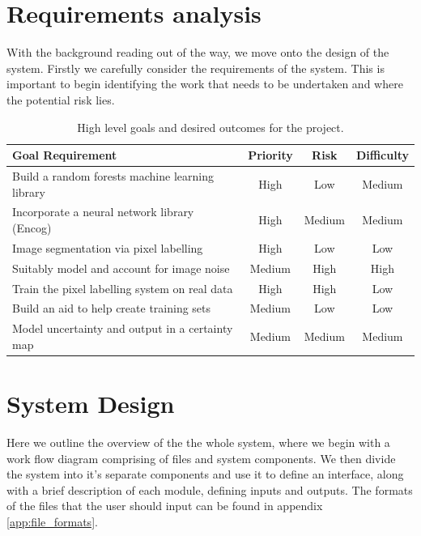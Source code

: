 \documentclass[12pt,twoside,notitlepage]{report}
\begin{document}
    \section{Requirements analysis}
        With the background reading out of the way, we move onto the design of the system. Firstly we carefully consider 
        the requirements of the system. This is important to begin identifying the work that needs to be undertaken 
        and where the potential risk lies. 

        \begin{table}[H]
            \begin{minipage}{\textwidth}
                \begin{tabular}{lccc}
                    \hline 
                        \textbf{Goal Requirement} & \textbf{Priority} & \textbf{Risk} & \textbf{Difficulty} \\
                    \hline 
                        Build a random forests machine learning library       & High      & Low         & Medium    \\
                        Incorporate a neural network library (Encog)          & High      & Medium      & Medium    \\
                        Image segmentation via pixel labelling                & High      & Low         & Low       \\
                        Suitably model and account for image noise            & Medium    & High        & High      \\ 
                        Train the pixel labelling system on real data         & High      & High        & Low       \\
                        Build an aid to help create training sets             & Medium    & Low         & Low       \\
                        Model uncertainty and output in a certainty map       & Medium    & Medium      & Medium    \\
                    \hline  
                \end{tabular}
            \end{minipage}
            \caption{High level goals and desired outcomes for the project.}
        \end{table}


    \section{System Design}
        Here we outline the overview of the the whole system, where we begin with a work flow diagram comprising of 
        files and system components. We then divide the system into it's separate components and use it to define an 
        interface, along with a brief description of each module, defining inputs and outputs. The formats of the files 
        that the user should input can be found in appendix \ref{app:file_formats}.
\end{document}
